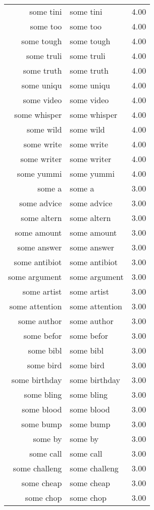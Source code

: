 \begin{table}[ht]
\begin{tabular}{rlr}
  some tini & some tini & 4.00 \\ 
  some too & some too & 4.00 \\ 
  some tough & some tough & 4.00 \\ 
  some truli & some truli & 4.00 \\ 
  some truth & some truth & 4.00 \\ 
  some uniqu & some uniqu & 4.00 \\ 
  some video & some video & 4.00 \\ 
  some whisper & some whisper & 4.00 \\ 
  some wild & some wild & 4.00 \\ 
  some write & some write & 4.00 \\ 
  some writer & some writer & 4.00 \\ 
  some yummi & some yummi & 4.00 \\ 
  some a & some a & 3.00 \\ 
  some advice & some advice & 3.00 \\ 
  some altern & some altern & 3.00 \\ 
  some amount & some amount & 3.00 \\ 
  some answer & some answer & 3.00 \\ 
  some antibiot & some antibiot & 3.00 \\ 
  some argument & some argument & 3.00 \\ 
  some artist & some artist & 3.00 \\ 
  some attention & some attention & 3.00 \\ 
  some author & some author & 3.00 \\ 
  some befor & some befor & 3.00 \\ 
  some bibl & some bibl & 3.00 \\ 
  some bird & some bird & 3.00 \\ 
  some birthday & some birthday & 3.00 \\ 
  some bling & some bling & 3.00 \\ 
  some blood & some blood & 3.00 \\ 
  some bump & some bump & 3.00 \\ 
  some by & some by & 3.00 \\ 
  some call & some call & 3.00 \\ 
  some challeng & some challeng & 3.00 \\ 
  some cheap & some cheap & 3.00 \\ 
  some chop & some chop & 3.00 \\ 

\end{tabular}
\end{table}
